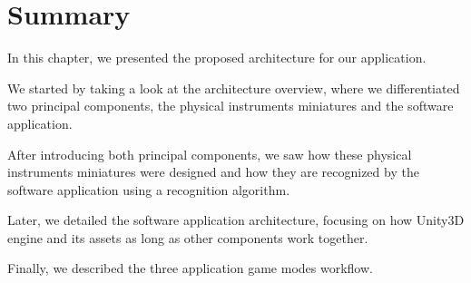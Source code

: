 \FloatBarrier

\section{Summary}
In this chapter, we presented the proposed architecture for our application.

We started by taking a look at the architecture overview, where we differentiated two principal components, the physical instruments miniatures and the software application.

After introducing both principal components, we saw how these physical instruments miniatures were designed and how they are recognized by the software application using a recognition algorithm.

Later, we detailed the software application architecture, focusing on how Unity3D engine and its assets as long as other components work together.

Finally, we described the three application game modes workflow.
